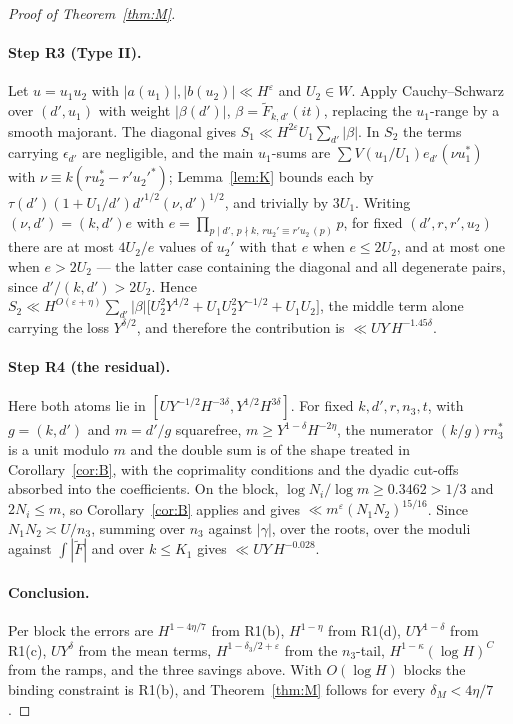 \documentclass[11pt,a4paper]{article}
\begin{document}
\begin{proof}[Proof of Theorem~\ref{thm:M}]
\paragraph{Step R3 (Type II).} Let $u=u_1u_2$ with $|a(u_1)|,|b(u_2)|\ll H^{\varepsilon}$ and $U_2\in W$. Apply Cauchy--Schwarz over $(d',u_1)$ with weight $|\beta(d')|$,
$\beta=\widetilde F_{k,d'}(it)$, replacing the $u_1$-range by a smooth majorant. The diagonal gives $S_1\ll H^{2\varepsilon}U_1\sum_{d'}|\beta|$. In $S_2$ the terms carrying
$\epsilon_{d'}$ are negligible, and the main $u_1$-sums are $\sum V(u_1/U_1)e_{d'}(\nu u_1^\ast)$ with $\nu\equiv k(ru_2^\ast-r'u_2'^\ast)$; Lemma~\ref{lem:K} bounds each by
$\tau(d')(1+U_1/d')d'^{1/2}(\nu,d')^{1/2}$, and trivially by $3U_1$. Writing $(\nu,d')=(k,d')e$ with $e=\prod_{p\mid d',\,p\nmid k,\,ru_2'\equiv r'u_2\,(p)}p$, for fixed
$(d',r,r',u_2)$ there are at most $4U_2/e$ values of $u_2'$ with that $e$ when $e\le2U_2$, and at most one when $e>2U_2$ --- the latter case containing the diagonal and all degenerate
pairs, since $d'/(k,d')>2U_2$. Hence $S_2\ll H^{O(\varepsilon+\eta)}\sum_{d'}|\beta|\bigl[U_2^2Y^{1/2}+U_1U_2^2Y^{-1/2}+U_1U_2\bigr]$, the middle term alone carrying the loss
$Y^{\delta/2}$, and therefore the contribution is $\ll UY\,H^{-1.45\delta}$.

\paragraph{Step R4 (the residual).} Here both atoms lie in $[UY^{-1/2}H^{-3\delta},Y^{1/2}H^{3\delta}]$. For fixed $k,d',r,n_3,t$, with $g=(k,d')$ and $m=d'/g$ squarefree,
$m\ge Y^{1-\delta}H^{-2\eta}$, the numerator $(k/g)rn_3^\ast$ is a unit modulo $m$ and the double sum is of the shape treated in Corollary~\ref{cor:B}, with the coprimality
conditions and the dyadic cut-offs absorbed into the coefficients. On the block, $\log N_i/\log m\ge0.3462>1/3$ and $2N_i\le m$, so Corollary~\ref{cor:B} applies and gives
$\ll m^{\varepsilon}(N_1N_2)^{15/16}$. Since $N_1N_2\asymp U/n_3$, summing over $n_3$ against $|\gamma|$, over the roots, over the moduli against $\int|\widetilde F|$ and over
$k\le K_1$ gives $\ll UY\,H^{-0.028}$.

\paragraph{Conclusion.} Per block the errors are $H^{1-4\eta/7}$ from R1(b), $H^{1-\eta}$ from R1(d), $UY^{1-\delta}$ from R1(c), $UY^{\delta}$ from the mean terms,
$H^{1-\delta_3/2+\varepsilon}$ from the $n_3$-tail, $H^{1-\kappa}(\log H)^C$ from the ramps, and the three savings above. With $O(\log H)$ blocks the binding constraint is R1(b), and
Theorem~\ref{thm:M} follows for every $\delta_M<4\eta/7$.
\end{proof}
\end{document}
